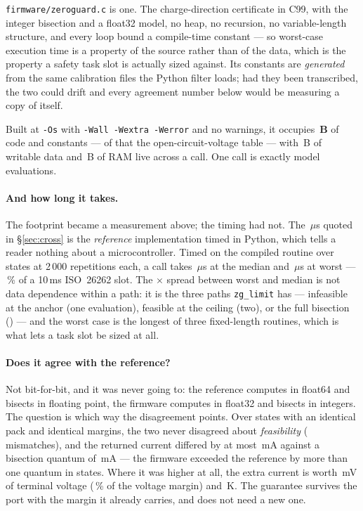 \documentclass[11pt,letterpaper]{article}
\theoremstyle{definition}
\theoremstyle{remark}
\begin{document}
\texttt{firmware/zeroguard.c} is one. The charge-direction certificate in C99, with the integer
bisection and a float32 model, no heap, no recursion, no variable-length structure, and every
loop bound a compile-time constant --- so worst-case execution time is a property of the source
rather than of the data, which is the property a safety task slot is actually sized against. Its
constants are \emph{generated} from the same calibration files the Python filter loads; had they
been transcribed, the two could drift and every agreement number below would be measuring a copy
of itself.

Built at \texttt{-Os} with \texttt{-Wall -Wextra -Werror} and no warnings, it occupies
\textbf{\fwText\,B} of code and constants --- \fwOcv{} of that the open-circuit-voltage table ---
with \fwData\,B of writable data and \fwRam\,B of RAM live across a call. One call is exactly
\fwEvals{} model evaluations.

\paragraph{And how long it takes.} The footprint became a measurement above; the timing had not.
The \worstLatency\,$\mu$s quoted in \S\ref{sec:cross} is the \emph{reference} implementation
timed in Python, which tells a reader nothing about a microcontroller. Timed on the compiled
routine over \fwBenchStates{} states at 2\,000 repetitions each, a call takes \fwUsMed\,$\mu$s at
the median and \fwUsMax\,$\mu$s at worst --- \fwSlotPct\,\% of a 10\,ms ISO~26262 slot. The
\fwSpread$\times$ spread between worst and median is not data dependence within a path: it is the
three paths \texttt{zg\_limit} has --- infeasible at the anchor (one evaluation), feasible at the
ceiling (two), or the full bisection (\fwEvals) --- and the worst case is the longest of three
fixed-length routines, which is what lets a task slot be sized at all.

\paragraph{Does it agree with the reference?} Not bit-for-bit, and it was never going to: the
reference computes in float64 and bisects in floating point, the firmware computes in float32
and bisects in integers. The question is which way the disagreement points. Over \fwStates{}
states with an identical pack and identical margins, the two never disagreed about
\emph{feasibility} (\fwMismatch{} mismatches), and the returned current differed by at most
\fwMaxDev\,mA against a bisection quantum of \fwQuantum\,mA --- the firmware exceeded the
reference by more than one quantum in \fwAbove{} states. Where it was higher at all, the extra
current is worth \fwVcost\,mV of terminal voltage (\fwVfrac\,\% of the voltage margin) and
\fwTcost\,K. The guarantee survives the port with the margin it already carries, and does not
need a new one.
\end{document}
